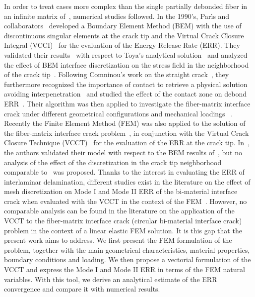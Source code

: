 \documentclass[review]{elsarticle}
\begin{document}
In order to treat cases more complex than the single partially debonded fiber in an infinite matrix of~\cite{England1966,Perlman1967,Toya1974}, numerical studies followed. In the 1990's, Par{\'{\i}}s and collaborators~\cite{Paris1996} developed a Boundary Element Method (BEM) with the use of discontinuous singular elements at the crack tip and the Virtual Crack Closure Integral (VCCI)~\cite{Irwin1958} for the evaluation of the Energy Release Rate (ERR). They validated their results~\cite{Paris1996} with respect to Toya's analytical solution~\cite{Toya1974} and analyzed the effect of BEM interface discretization on the stress field in the neighborhood of the crack tip~\cite{DelCano1997}. Following Comninou's work on the straight crack~\cite{Comninou1977}, they furthermore recognized the importance of contact to retrieve a physical solution avoiding interpenetration~\cite{Paris1996} and studied the effect of the contact zone on debond ERR~\cite{Varna1997a}. Their algorithm was then applied to investigate the fiber-matrix interface crack under different geometrical configurations and mechanical loadings ~\cite{Paris2007,Correa2007,Correa2011,Correa2013,Correa2014,Sandino2016,Sandino2018}.\\
Recently the Finite Element Method (FEM) was also applied to the solution of the fiber-matrix interface crack problem~\cite{Zhuang2018,Varna2017,Zhuang2018a}, in conjunction with the Virtual Crack Closure Technique (VCCT)~\cite{Rybicki1977,Krueger2004} for the evaluation of the ERR at the crack tip. In~\cite{Zhuang2018}, the authors validated their model with respect to the BEM results of~\cite{Paris1996}, but no analysis of the effect of the discretization in the crack tip neighborhood comparable to~\cite{DelCano1997} was proposed. Thanks to the interest in evaluating the ERR of interlaminar delamination, different studies exist in the literature on the effect of mesh discretization on Mode I and Mode II ERR of the bi-material interface crack when evaluated with the VCCT in the context of the FEM~\cite{Sun1987,Manoharan1990,Sun1997}. However, no comparable analysis can be found in the literature on the application of the VCCT to the fiber-matrix interface crack (circular bi-material interface crack) problem in the context of a linear elastic FEM solution. It is this gap that the present work aims to address. We first present the FEM formulation of the problem, together with the main geometrical characteristics, material properties, boundary conditions and loading. We then propose a vectorial formulation of the VCCT and express the Mode I and Mode II ERR in terms of the FEM natural variables. With this tool, we derive an analytical estimate of the ERR convergence and compare it with numerical results.
\end{document}
